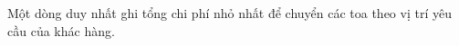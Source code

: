 Một dòng duy nhất ghi tổng chi phí nhỏ nhất để chuyển các toa theo vị trí yêu cầu của khác hàng.  

\